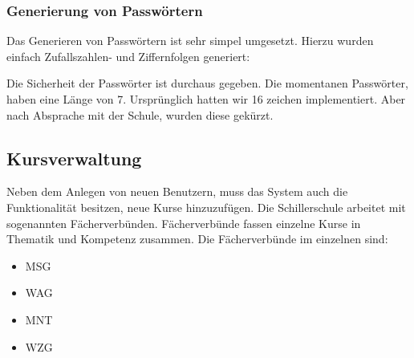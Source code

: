 	


\subsubsection{Generierung von Passwörtern}

Das Generieren von Passwörtern ist sehr simpel umgesetzt. Hierzu wurden einfach Zufallszahlen- und Ziffernfolgen generiert:

	
	
Die Sicherheit der Passwörter ist durchaus gegeben.
Die momentanen Passwörter, haben eine Länge von 7. Ursprünglich hatten wir 16 zeichen implementiert. Aber nach Absprache mit der Schule, wurden diese gekürzt.

\subsection{Kursverwaltung}

Neben dem Anlegen von neuen Benutzern, muss das System auch die Funktionalität besitzen, neue Kurse hinzuzufügen.
Die Schillerschule arbeitet mit sogenannten Fächerverbünden. Fächerverbünde fassen einzelne Kurse in Thematik und Kompetenz zusammen.
Die Fächerverbünde im einzelnen sind:

\begin{itemize}
  \item \ac{MSG}

  \item \ac{WAG}
  
  \item \ac{MNT}
  
  \item \ac{WZG}
\end{itemize}

